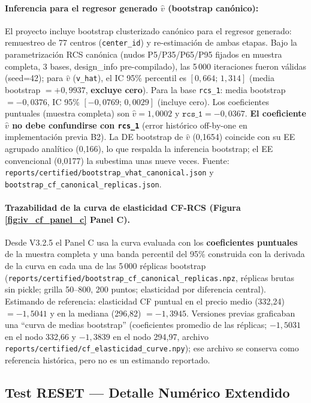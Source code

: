 \documentclass[doc, a4paper, biblatex, floatsintext, longtable, babel]{apa7}
\begin{document}
\paragraph{Inferencia para el regresor generado $\hat{v}$ (bootstrap canónico):} El proyecto incluye bootstrap clusterizado canónico para el regresor generado: remuestreo de 77 centros (\texttt{center\_id}) y re-estimación de ambas etapas. Bajo la parametrización RCS canónica (nudos P5/P35/P65/P95 fijados en muestra completa, 3 bases, design\_info pre-compilado), las 5\,000 iteraciones fueron válidas (seed=42); para $\hat{v}$ (\texttt{v\_hat}), el IC 95\% percentil es \textbf{$[0,664;\,1,314]$} (media bootstrap $= +0,9937$, \textbf{excluye cero}). Para la base \texttt{rcs\_1}: media bootstrap $= -0,0376$, IC 95\% $[-0,0769;\,0,0029]$ (incluye cero). Los coeficientes puntuales (muestra completa) son $\hat{v}=1,0002$ y $\texttt{rcs\_1}=-0,0367$. \textbf{El coeficiente $\hat{v}$ no debe confundirse con \texttt{rcs\_1}} (error histórico off-by-one en implementación previa B2). La DE bootstrap de $\hat{v}$ (0,1654) coincide con su EE agrupado analítico (0,166), lo que respalda la inferencia bootstrap; el EE convencional (0,0177) la subestima unas nueve veces. Fuente: \texttt{reports/certified/bootstrap\_vhat\_canonical.json} y \texttt{bootstrap\_cf\_canonical\_replicas.json}.

\paragraph{Trazabilidad de la curva de elasticidad CF-RCS (Figura \ref{fig:iv_cf_panel_c} Panel C).}
Desde V3.2.5 el Panel C usa la curva evaluada con los \textbf{coeficientes puntuales} de la muestra completa y una banda percentil del 95\% construida con la derivada de la curva en cada una de las 5\,000 réplicas bootstrap (\texttt{reports/certified/bootstrap\_cf\_canonical\_replicas.npz}, réplicas brutas sin pickle; grilla 50--800, 200 puntos; elasticidad por diferencia central). Estimando de referencia: elasticidad CF puntual en el precio medio (332,24) $=-1,5041$ y en la mediana (296,82) $=-1,3945$. Versiones previas graficaban una ``curva de medias bootstrap'' (coeficientes promedio de las réplicas; $-1,5031$ en el nodo 332,66 y $-1,3839$ en el nodo 294,97, archivo \texttt{reports/certified/cf\_elasticidad\_curve.npy}); ese archivo se conserva como referencia histórica, pero no es un estimando reportado.

\subsection{Test RESET --- Detalle Numérico Extendido}
\label{subsec:appendix_reset}
\end{document}
